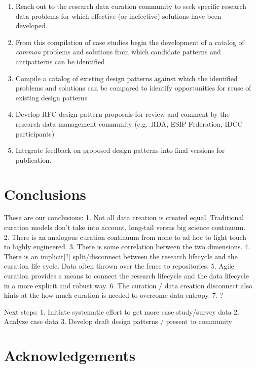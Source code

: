 \documentclass[paper]{ijdc-v9}
\begin{document}
\begin{enumerate}
\def\labelenumi{\arabic{enumi}.}
\itemsep1pt\parskip0pt
\item
  Reach out to the research data curation community to seek specific
  research data problems for which effective (or inefective) solutions
  have been developed.
\item
  From this compilation of case studies begin the development of a
  catalog of \emph{common} problems and solutions from which candidate
  patterns and antipatterns can be identified
\item
  Compile a catalog of existing design patterns against which the
  identified problems and solutions can be compared to identify
  opportunities for reuse of existing design patterns
\item
  Develop RFC design pattern proposals for review and comment by the
  research data management community (e.g.~RDA, ESIP Federation, IDCC
  participants)
\item
  Integrate feedback on proposed design patterns into final versions for
  publication.
\end{enumerate}

\section{Conclusions}\label{conclusions}

These are our conclusions: 1. Not all data creation is created equal.
Traditional curation models don't take into account, long-tail versus
big science continuum. 2. There is an analogous curation continuum from
none to ad hoc to light touch to highly engineered. 3. There is some
correlation between the two dimensions. 4. There is an implicit{[}?{]}
split/disconnect between the research lifecycle and the curation life
cycle. Data often thrown over the fence to repositories. 5. Agile
curation provides a means to connect the research lifecycle and the data
lifecycle in a more explicit and robust way. 6. The curation / data
creation disconnect also hints at the how much curation is needed to
overcome data entropy. 7. ?

Next steps: 1. Initiate systematic effort to get more case study/survey
data 2. Analyze case data 3. Develop draft design patterns / present to
community

\section{Acknowledgements}\label{acknowledgements}
\end{document}
